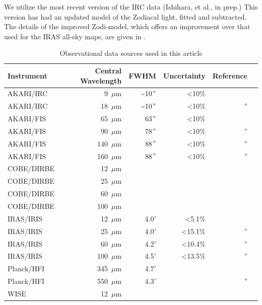 \documentclass[preprint2,longabstract]{aastex}
\begin{document}
      We utilize the most recent version of the IRC data (Ishihara, et al., in prep.) This version has had an updated model of the Zodiacal light, fitted and subtracted. The details of the improved Zodi-model, which offers an improvement over that used for the IRAS all-sky maps, are given in \cite{kondo16}.
\begin{table}
\label{tab:data}
\caption{Observational data sources used in this article}
\centering
\begin{tabular}{lrrrrr}
\hline\hline
Instrument & Central Wavelength & FWHM & Uncertainty & Reference \\
\hline
AKARI/IRC & 9~$\mu$m  &  \~{}10$"$ & \textless 10\%   & \citep{ishihara10} \\
AKARI/IRC & 18~$\mu$m & \~{}10$"$  & \textless 10\%     & '' \\
AKARI/FIS & 65~$\mu$m  & 63$"$ & \textless 10\% & \citep{doi15,takita16} \\
AKARI/FIS & 90~$\mu$m  & 78$"$ & \textless 10\%   & '' \\
AKARI/FIS & 140~$\mu$m & 88$"$ & \textless 10\%   & '' \\
AKARI/FIS & 160~$\mu$m & 88$"$ & \textless 10\%   & '' \\
COBE/DIRBE & 12~$\mu$m & & & \\
COBE/DIRBE & 25~$\mu$m & & & \\
COBE/DIRBE & 60~$\mu$m & & & \\
COBE/DIRBE & 100~$\mu$m & & & \\
IRAS/IRIS & 12~$\mu$m   & 4.0$'$ &   \textless 5.1\%       & \citep{iris05} \\
IRAS/IRIS & 25~$\mu$m   & 4.0$'$ &    \textless 15.1\%      & ''\\
IRAS/IRIS & 60~$\mu$m   & 4.2$'$ &    \textless 10.4\%      & '' \\
IRAS/IRIS & 100~$\mu$m  & 4.5$'$ &   \textless 13.5\%       & '' \\
Planck/HFI & 345~$\mu$m & 4.7$'$ & & \citep{hfi14viii} \\
Planck/HFI & 550~$\mu$m & 4.3$'$& & '' \\
WISE & 12~$\mu$m & & & &  \\
\hline
\end{tabular}
\end{table}
\end{document}
